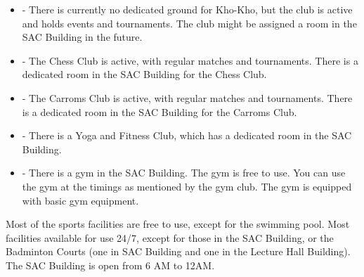 \documentclass[openany]{book}
\begin{document}
\begin{itemize}
    \item {} - There is currently no dedicated ground for Kho-Kho, but the club is active and holds events and tournaments. The club might be assigned a room in the SAC Building in the future.
    \item {} - The Chess Club is active, with regular matches and tournaments. There is a dedicated room in the SAC Building for the Chess Club.
    \item {} - The Carroms Club is active, with regular matches and tournaments. There is a dedicated room in the SAC Building for the Carroms Club.
    \item {} - There is a Yoga and Fitness Club, which has a dedicated room in the SAC Building. 
    \item {} - There is a gym in the SAC Building. The gym is free to use. You can use the gym at the timings as mentioned by the gym club. The gym is equipped with basic gym equipment. 
\end{itemize}
\begin{mynote}
    Most of the sports facilities are free to use, except for the swimming pool. Most facilities available for use 24/7, except for those in the SAC Building, or the Badminton Courts (one in SAC Building and one in the Lecture Hall Building). The SAC Building is open from 6 AM to 12AM. 
\end{mynote}
\end{document}

